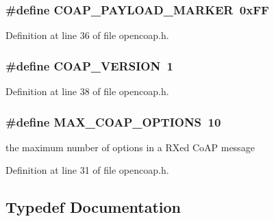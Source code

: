 \subsubsection[{\texorpdfstring{C\+O\+A\+P\+\_\+\+P\+A\+Y\+L\+O\+A\+D\+\_\+\+M\+A\+R\+K\+ER}{COAP_PAYLOAD_MARKER}}]{\setlength{\rightskip}{0pt plus 5cm}\#define C\+O\+A\+P\+\_\+\+P\+A\+Y\+L\+O\+A\+D\+\_\+\+M\+A\+R\+K\+ER~0x\+FF}\hypertarget{group__open_coap_gab4e38910080deed0a5df4aec116d3999}{}\label{group__open_coap_gab4e38910080deed0a5df4aec116d3999}


Definition at line 36 of file opencoap.\+h.

\subsubsection[{\texorpdfstring{C\+O\+A\+P\+\_\+\+V\+E\+R\+S\+I\+ON}{COAP_VERSION}}]{\setlength{\rightskip}{0pt plus 5cm}\#define C\+O\+A\+P\+\_\+\+V\+E\+R\+S\+I\+ON~1}\hypertarget{group__open_coap_ga0cc059ba01b6be3d8abe18cc96ab2221}{}\label{group__open_coap_ga0cc059ba01b6be3d8abe18cc96ab2221}


Definition at line 38 of file opencoap.\+h.

\subsubsection[{\texorpdfstring{M\+A\+X\+\_\+\+C\+O\+A\+P\+\_\+\+O\+P\+T\+I\+O\+NS}{MAX_COAP_OPTIONS}}]{\setlength{\rightskip}{0pt plus 5cm}\#define M\+A\+X\+\_\+\+C\+O\+A\+P\+\_\+\+O\+P\+T\+I\+O\+NS~10}\hypertarget{group__open_coap_ga3155afe0b07d32f0fb33faabc0ea0ec6}{}\label{group__open_coap_ga3155afe0b07d32f0fb33faabc0ea0ec6}


the maximum number of options in a RX\textquotesingle{}ed Co\+AP message 



Definition at line 31 of file opencoap.\+h.



\subsection{Typedef Documentation}
